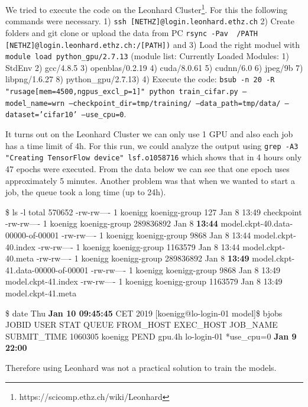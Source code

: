 \documentclass[10pt,twocolumn,letterpaper]{article}
\begin{document}
We tried to execute the code on the Leonhard Cluster\footnote{https://scicomp.ethz.ch/wiki/Leonhard}. For this the following commands were necessary. 1) \texttt{ssh [NETHZ]@login.leonhard.ethz.ch} 2) Create folders and git clone or upload the data from PC \texttt{rsync -Pav ~/PATH [NETHZ]@login.leonhard.ethz.ch:/[PATH])} and 3) Load the right moduel with \texttt{module load python\_gpu/2.7.13} (module list: Currently Loaded Modules: 1) StdEnv   2) gcc/4.8.5   3) openblas/0.2.19   4) cuda/8.0.61   5) cudnn/6.0   6) jpeg/9b   7) libpng/1.6.27   8) python\_gpu/2.7.13) 4) Execute the code: \texttt{bsub -n 20 -R "rusage[mem=4500,ngpus\_excl\_p=1]" python train\_cifar.py --model\_name=wrn --checkpoint\_dir=tmp/training/ --data\_path=tmp/data/ --dataset='cifar10' --use\_cpu=0}. \newline

It turns out on the Leonhard Cluster we can only use 1 GPU and also each job has a time limit of 4h. For this run, we could analyze the output using \texttt{grep -A3 "Creating TensorFlow device" lsf.o1058716} which shows that in 4 hours only 47 epochs were executed. From the data below we can see that one epoch uses approximately 5 minutes. Another problem was that when we wanted to start a job, the queue took a long time (up to 24h). \newline

\$ ls -l
total 570652
-rw-rw---- 1 koenigg koenigg-group       127 Jan  8 13:49 checkpoint
-rw-rw---- 1 koenigg koenigg-group 289836892 Jan  8 \textbf{13:44} model.ckpt-40.data-00000-of-00001
-rw-rw---- 1 koenigg koenigg-group      9868 Jan  8 13:44 model.ckpt-40.index
-rw-rw---- 1 koenigg koenigg-group   1163579 Jan  8 13:44 model.ckpt-40.meta
-rw-rw---- 1 koenigg koenigg-group 289836892 Jan  8 \textbf{13:49} model.ckpt-41.data-00000-of-00001
-rw-rw---- 1 koenigg koenigg-group      9868 Jan  8 13:49 model.ckpt-41.index
-rw-rw---- 1 koenigg koenigg-group   1163579 Jan  8 13:49 model.ckpt-41.meta \newline

\$ date
Thu \textbf{Jan 10 09:45:45} CET 2019
[koenigg@lo-login-01 model]\$ bjobs
JOBID USER STAT QUEUE FROM\_HOST EXEC\_HOST JOB\_NAME SUBMIT\_TIME 1060305 koenigg PEND gpu.4h lo-login-01 *use\_cpu=0 \textbf{Jan  9 22:00}\newline

Therefore using Leonhard was not a practical solution to train the models.\newline
\end{document}
